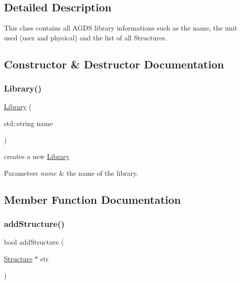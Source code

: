 \subsection{Detailed Description}
This class contains all A\+G\+DS library informations such as the name, the unit used (user and physical) and the list of all Structures. 

\subsection{Constructor \& Destructor Documentation}
\mbox{\label{class_a_g_d_s_1_1_library_a9244ebe2cc60781aaf25cf559ea2473a}} 
\subsubsection{\texorpdfstring{Library()}{Library()}}
{\footnotesize\ttfamily \hyperlink{class_a_g_d_s_1_1_library}{Library} (\begin{DoxyParamCaption}\item[{std\+::string}]{name }\end{DoxyParamCaption})}



creates a new \hyperlink{class_a_g_d_s_1_1_library}{Library} 


\begin{DoxyParams}{Parameters}
{\em name} & the name of the library. \\
\hline
\end{DoxyParams}


\subsection{Member Function Documentation}
\mbox{\label{class_a_g_d_s_1_1_library_a93d333a20154e0b688ff3ff213039171}} 
\subsubsection{\texorpdfstring{add\+Structure()}{addStructure()}}
{\footnotesize\ttfamily bool add\+Structure (\begin{DoxyParamCaption}\item[{\hyperlink{class_a_g_d_s_1_1_structure}{Structure} $\ast$}]{str }\end{DoxyParamCaption})}



